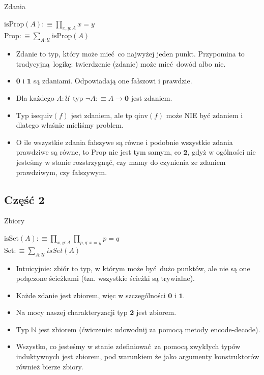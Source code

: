 \documentclass{beamer}
\newcommand{\defn}{:\equiv}
\newcommand{\U}{\mathcal{U}}
\newcommand{\qinv}{\text{qinv}}
\newcommand{\isequiv}{\text{isequiv}}
\newcommand{\isProp}{\text{isProp}}
\newcommand{\isSet}{\text{isSet}}
\newcommand{\Prop}{\text{Prop}}
\newcommand{\Set}{\text{Set}}
\begin{document}
\begin{frame}{Zdania}

\begin{definition}[Zdanie]
$\isProp(A) \defn \prod_{x, y : A} x = y$ \\
$\Prop \defn \sum_{A : \U} \isProp(A)$
\end{definition}

\begin{itemize}
	\item Zdanie to typ, który może mieć co najwyżej jeden punkt. Przypomina to tradycyjną logikę: twierdzenie (zdanie) może mieć dowód albo nie.
	\item $\mathbf{0}$ i $\mathbf{1}$ są zdaniami. Odpowiadają one fałszowi i prawdzie.
	\item Dla każdego $A : \U$ typ $\neg A \defn A \to \mathbf{0}$ jest zdaniem.
	\item Typ $\isequiv(f)$ jest zdaniem, ale tp $\qinv(f)$ może NIE być zdaniem i dlatego właśnie mieliśmy problem.
	\item O ile wszystkie zdania fałszywe są równe i podobnie wszystkie zdania prawdziwe są równe, to $\Prop$ nie jest tym samym, co $\mathbf{2}$, gdyż w ogólności nie jesteśmy w stanie rozstrzygnąć, czy mamy do czynienia ze zdaniem prawdziwym, czy fałszywym.
\end{itemize}

\end{frame}

\subsection{Część 2}

\begin{frame}{Zbiory}

\begin{definition}[Zbiór]
$\isSet(A) \defn \prod_{x, y : A} \prod_{p, q : x = y} p = q$ \\
$\Set \defn \sum_{A : \U} isSet(A)$
\end{definition}

\begin{itemize}
	\item Intuicyjnie: zbiór to typ, w którym może być dużo punktów, ale nie są one połączone ścieżkami (tzn. wszystkie ścieżki są trywialne).
	\item Każde zdanie jest zbiorem, więc w szczególności $\mathbf{0}$ i $\mathbf{1}$.
	\item Na mocy naszej charakteryzacji typ $\mathbf{2}$ jest zbiorem.
	\item Typ $\mathbb{N}$ jest zbiorem (ćwiczenie: udowodnij za pomocą metody encode-decode).
	\item Wszystko, co jesteśmy w stanie zdefiniować za pomocą zwykłych typów induktywnych jest zbiorem, pod warunkiem że jako argumenty konstruktorów również bierze zbiory.
\end{itemize}

\end{frame}
\end{document}

